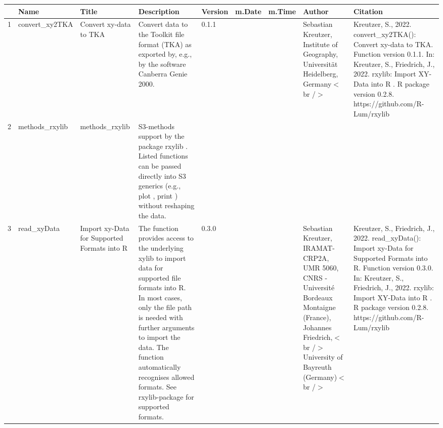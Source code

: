 \begin{table}[ht]
\centering
\begin{tabular}{rllllllll}
  \hline
 & Name & Title & Description & Version & m.Date & m.Time & Author & Citation \\ 
  \hline
1 & convert\_xy2TKA & Convert xy-data to TKA & Convert data to the Toolkit file format (TKA) as exported by, e.g., by the software Canberra Genie 2000. & 0.1.1
 &  &  & Sebastian Kreutzer, Institute of Geography, Universität Heidelberg, Germany$<$br /$>$ & Kreutzer, S., 2022. convert\_xy2TKA(): Convert xy-data to TKA. Function version 0.1.1. In: Kreutzer, S., Friedrich, J., 2022. rxylib: Import XY-Data into R . R package version 0.2.8. https://github.com/R-Lum/rxylib
 \\ 
  2 & methods\_rxylib & methods\_rxylib & S3-methods support by the package  rxylib . Listed functions can be passed directly into S3 generics (e.g.,  plot ,  print ) without reshaping the data. &  &  &  &  &  \\ 
  3 & read\_xyData & Import xy-Data for Supported Formats into R & The function provides access to the underlying  xylib  to import data for supported file formats into R. In most cases, only the file path is needed with further arguments to import the data. The function automatically recognises allowed formats. See  rxylib-package  for supported formats. & 0.3.0
 &  &  & Sebastian Kreutzer, IRAMAT-CRP2A, UMR 5060, CNRS - Université Bordeaux Montaigne (France), Johannes Friedrich,$<$br /$>$ University of Bayreuth (Germany)$<$br /$>$ & Kreutzer, S., Friedrich, J., 2022. read\_xyData(): Import xy-Data for Supported Formats into R. Function version 0.3.0. In: Kreutzer, S., Friedrich, J., 2022. rxylib: Import XY-Data into R . R package version 0.2.8. https://github.com/R-Lum/rxylib
 \\ 
   \hline
\end{tabular}
\end{table}

